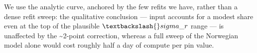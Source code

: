 \documentclass[
  11pt,
]{article}
\newenvironment{Shaded}{\begin{snugshade}}{\end{snugshade}}
\newcommand{\NormalTok}[1]{\textcolor[rgb]{0.00,0.23,0.31}{#1}}
\begin{document}
\begin{Shaded}
\begin{Highlighting}[]
\NormalTok{We use the analytic curve, anchored by the few refits we have, rather than a}
\NormalTok{dense refit sweep: the qualitative conclusion — input accounts for a modest share}
\NormalTok{even at the top of the plausible $\textbackslash{}sigma\_r$ range — is unaffected by the}
\NormalTok{\textasciitilde{}2{-}point correction, whereas a full sweep of the Norwegian model alone would cost}
\NormalTok{roughly half a day of compute per pin value.}
\end{Highlighting}
\end{Shaded}
\end{document}
